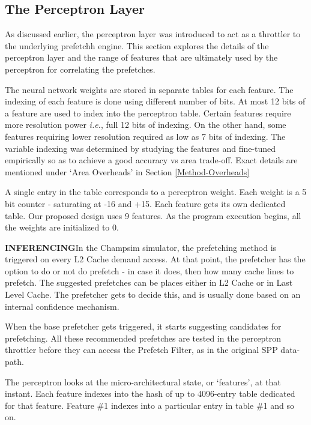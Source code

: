 \subsection{The Perceptron Layer}
\label{Design-Perceptron}
As discussed earlier, the perceptron layer was introduced to act as a
throttler to the underlying prefetchh engine.  This section explores the
details of the perceptron layer and the range of features that are
ultimately used by the perceptron for correlating the prefetches.

The neural network weights are stored in separate tables for each
feature.  The indexing of each feature is done using different number
of bits.  At most 12 bits of a feature are used to index into the
perceptron table.  Certain features require more resolution power
\textit{i.e.}, full 12 bits of indexing.  On the other hand, some
features requiring lower resolution required as low as 7 bits of
indexing.  The variable indexing was determined by studying the
features and fine-tuned empirically so as to achieve a good accuracy
vs area trade-off.  Exact details are mentioned under `Area Overheads'
in Section \ref{Method-Overheads}

A single entry in the table corresponds to a perceptron weight.  Each
weight is a 5 bit counter - saturating at -16 and +15.  Each feature
gets its own dedicated table.  Our proposed design uses 9 features.
As the program execution begins, all the weights are initialized to 0.

\textbf{INFERENCING}\newline In the Champsim simulator, the
prefetching method is triggered on every L2 Cache demand access.  At
that point, the prefetcher has the option to do or not do prefetch -
in case it does, then how many cache lines to prefetch.  The suggested
prefetches can be places either in L2 Cache or in Last Level Cache.
The prefetcher gets to decide this, and is usually done based on an
internal confidence mechanism.

When the base prefetcher gets triggered, it starts suggesting candidates for prefetching. 
All these
recommended prefetches are tested in the perceptron throttler before
they can access the Prefetch Filter, as in the original SPP data-path.

The perceptron looks at the micro-architectural state, or `features',
at that instant.  Each feature indexes into the hash of up to
4096-entry table dedicated for that feature.  Feature \#1 indexes into
a particular entry in table \#1 and so on.

